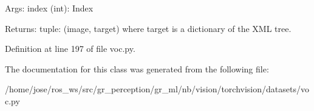 \begin{DoxyVerb}Args:
    index (int): Index

Returns:
    tuple: (image, target) where target is a dictionary of the XML tree.
\end{DoxyVerb}
 

Definition at line 197 of file voc.\+py.



The documentation for this class was generated from the following file\+:\begin{DoxyCompactItemize}
\item 
/home/jose/ros\+\_\+ws/src/gr\+\_\+perception/gr\+\_\+ml/nb/vision/torchvision/datasets/voc.\+py\end{DoxyCompactItemize}
